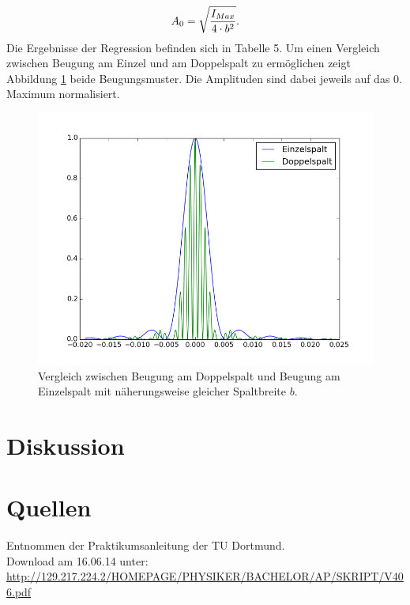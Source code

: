 \documentclass[11pt,ngerman,a4paper]{article}
\begin{document}
\[
A_0 = \sqrt{\frac{I_{Max}}{4\cdot b^2}}\rm.
\]
Die Ergebnisse der Regression befinden sich in Tabelle 5. Um einen Vergleich zwischen Beugung am Einzel und am Doppelspalt zu ermöglichen zeigt Abbildung \ref{plot3} beide Beugungsmuster. Die Amplituden sind dabei jeweils auf das 0. Maximum normalisiert. 
\begin{figure}[htp]
\centering
\includegraphics[scale=0.8]{plot4.png}
\caption{Vergleich zwischen Beugung am Doppelspalt und Beugung am Einzelspalt mit näherungsweise gleicher Spaltbreite $b$.}
\label{plot3}
\end{figure}

\subsection{}
\section{Diskussion}

\section{Quellen}
\begin{enumerate}[{[}1{]}]
\item Entnommen der Praktikumsanleitung \textit{} der TU Dortmund. \\
Download am 16.06.14 unter:\\
 \url{http://129.217.224.2/HOMEPAGE/PHYSIKER/BACHELOR/AP/SKRIPT/V406.pdf}
\end{enumerate}
\end{document}
